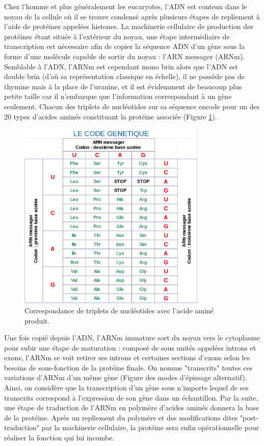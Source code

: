 Chez l'homme et plus généralement les eucaryotes, l'ADN est contenu dans le noyau de la cellule où il se trouve condensé après plusieurs étapes de repliement à l'aide de protéines appelées histones. La machinerie cellulaire de production des protéines étant située à l'extérieur du noyau, une étape intermédiaire de transcription est nécessaire afin de copier la séquence ADN d'un gène sous la forme d'une molécule capable de sortir du noyau : l'ARN messager (ARNm). Semblable à l'ADN, l'ARNm est cependant mono brin alors que l'ADN est double brin (d'où sa représentation classique en échelle), il ne possède pas de thymine mais à la place de l'uranine, et il est évidemment de beaucoup plus petite taille car il n'embarque que l'information correspondant à un gène seulement. Chacun des triplets de nucléotides sur sa séquence encode pour un des 20 types d'acides aminés constituant la protéine associée (Figure \ref{fig:intro_code_genetique}).

\begin{figure}[!ht]
    \centering
    \includegraphics[width=0.8\textwidth]{img/intro/code_genetique.png}
    \caption{Correspondance de triplets de nucléotides avec l'acide aminé produit.}
    \label{fig:intro_code_genetique}
\end{figure}


Une fois copié depuis l'ADN, l'ARNm immature sort du noyau vers le cytoplasme pour subir une étape de maturation : composé de sous unités appelées introns et exons, l'ARNm se voit retirer ses introns et certaines sections d'exons selon les besoins de sous-fonction de la protéine finale. On nomme "transcrits" toutes ces variations d'ARNm d'un même gène (Figure des modes d'épissage alternatif). Ainsi, on considère que la transcription d'un gène sous n'importe lequel de ses transcrits correspond à l'expression de son gène dans un échantillon. Par la suite, une étape de traduction de l'ARNm en polymère d'acides aminés donnera la base de la protéine. Après un repliement du polymère et des modifications dites "post-traduction" par la machinerie cellulaire, la protéine sera enfin opérationnelle pour réaliser la fonction qui lui incombe. 


